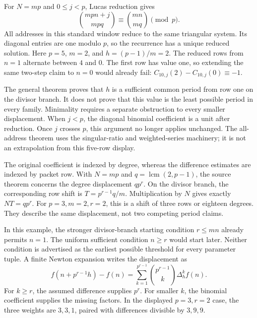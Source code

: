 For $N=mp$ and $0\le j<p$, Lucas reduction gives
\[
 \binom{mpn+j}{mpq}\equiv\binom{mn}{mq}\pmod p.
\]
All addresses in this standard window reduce to the same triangular system. Its diagonal entries are one modulo $p$, so the recurrence has a unique reduced solution.
Here $p=5$, $m=2$, and $h=(p-1)/m=2$. The reduced rows from $n=1$ alternate between $4$ and $0$. The first row has value one, so extending the same two-step claim to $n=0$ would already fail: $C_{10,j}(2)-C_{10,j}(0)\equiv-1$.

The general theorem proves that $h$ is a sufficient common period from row one on the divisor branch. It does not prove that this value is the least possible period in every family. Minimality requires a separate obstruction to every smaller displacement.
When $j<p$, the diagonal binomial coefficient is a unit after reduction. Once $j$ crosses $p$, this argument no longer applies unchanged. The all-address theorem uses the singular-ratio and weighted-series machinery; it is not an extrapolation from this five-row display.

The original coefficient is indexed by degree, whereas the difference estimates are indexed by packet row. With $N=mp$ and $q=\operatorname{lcm}(2,p-1)$, the source theorem concerns the degree displacement $qp^r$.
On the divisor branch, the corresponding row shift is $T=p^{r-1}q/m$. Multiplication by $N$ gives exactly $NT=qp^r$. For $p=3,m=2,r=2$, this is a shift of three rows or eighteen degrees. They describe the same displacement, not two competing period claims.

In this example, the stronger divisor-branch starting condition $r\le mn$ already permits $n=1$. The uniform sufficient condition $n\ge r$ would start later. Neither condition is advertised as the earliest possible threshold for every parameter tuple.
A finite Newton expansion writes the displacement as
\[
 f(n+p^{r-1}h)-f(n)
 =\sum_{k=1}^{p^{r-1}}\binom{p^{r-1}}k\Delta_h^k f(n).
\]
For $k\ge r$, the assumed difference supplies $p^r$. For smaller $k$, the binomial coefficient supplies the missing factors. In the displayed $p=3,r=2$ case, the three weights are $3,3,1$, paired with differences divisible by $3,9,9$.

